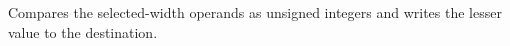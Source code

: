 Compares the selected-width operands as unsigned integers and writes the lesser value to the destination.
